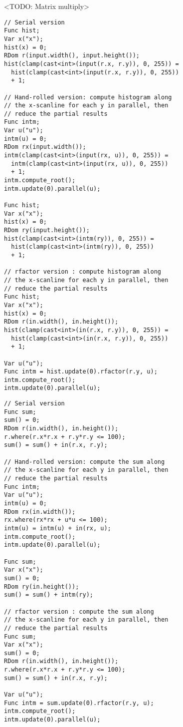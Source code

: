<TODO: Matrix multiply> \\

\begin{lstlisting}[caption={Histogram: serial version, hand-rollled parallel associative reduction version, and rfactor parallel associative reduction version}]
// Serial version
Func hist;
Var x("x");
hist(x) = 0;
RDom r(input.width(), input.height());
hist(clamp(cast<int>(input(r.x, r.y)), 0, 255)) =
  hist(clamp(cast<int>(input(r.x, r.y)), 0, 255))
  + 1;

// Hand-rolled version: compute histogram along
// the x-scanline for each y in parallel, then
// reduce the partial results
Func intm;
Var u("u");
intm(u) = 0;
RDom rx(input.width());
intm(clamp(cast<int>(input(rx, u)), 0, 255)) =
  intm(clamp(cast<int>(input(rx, u)), 0, 255))
  + 1;
intm.compute_root();
intm.update(0).parallel(u);

Func hist;
Var x("x");
hist(x) = 0;
RDom ry(input.height());
hist(clamp(cast<int>(intm(ry)), 0, 255)) =
  hist(clamp(cast<int>(intm(ry)), 0, 255))
  + 1;

// rfactor version : compute histogram along
// the x-scanline for each y in parallel, then
// reduce the partial results
Func hist;
Var x("x");
hist(x) = 0;
RDom r(in.width(), in.height());
hist(clamp(cast<int>(in(r.x, r.y)), 0, 255)) =
  hist(clamp(cast<int>(in(r.x, r.y)), 0, 255))
  + 1;

Var u("u");
Func intm = hist.update(0).rfactor(r.y, u);
intm.compute_root();
intm.update(0).parallel(u);
\end{lstlisting}

\begin{lstlisting}[caption={2D summation over a circular reduction domain with radius of 10: serial version, hand-rollled parallel associative reduction version, and rfactor parallel associative reduction version}]
// Serial version
Func sum;
sum() = 0;
RDom r(in.width(), in.height());
r.where(r.x*r.x + r.y*r.y <= 100);
sum() = sum() + in(r.x, r.y);

// Hand-rolled version: compute the sum along
// the x-scanline for each y in parallel, then
// reduce the partial results
Func intm;
Var u("u");
intm(u) = 0;
RDom rx(in.width());
rx.where(rx*rx + u*u <= 100);
intm(u) = intm(u) + in(rx, u);
intm.compute_root();
intm.update(0).parallel(u);

Func sum;
Var x("x");
sum() = 0;
RDom ry(in.height());
sum() = sum() + intm(ry);

// rfactor version : compute the sum along
// the x-scanline for each y in parallel, then
// reduce the partial results
Func sum;
Var x("x");
sum() = 0;
RDom r(in.width(), in.height());
r.where(r.x*r.x + r.y*r.y <= 100);
sum() = sum() + in(r.x, r.y);

Var u("u");
Func intm = sum.update(0).rfactor(r.y, u);
intm.compute_root();
intm.update(0).parallel(u);
\end{lstlisting}


